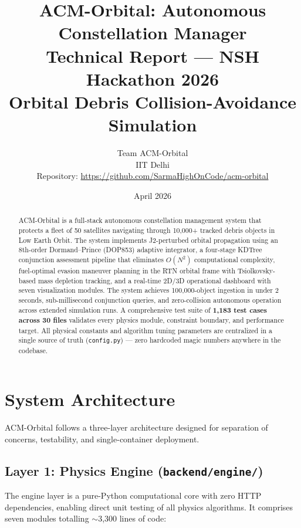\documentclass[11pt,a4paper]{article}
\title{
  \vspace{-1cm}
  \textbf{ACM-Orbital: Autonomous Constellation Manager}\\[6pt]
  \large Technical Report --- NSH Hackathon 2026\\[4pt]
  \normalsize Orbital Debris Collision-Avoidance Simulation
}
\author{
  Team ACM-Orbital\\
  IIT Delhi\\[4pt]
  \small Repository: \url{https://github.com/SarmaHighOnCode/acm-orbital}
}
\date{April 2026}
\begin{document}
\maketitle
\thispagestyle{fancy}

\begin{abstract}
ACM-Orbital is a full-stack autonomous constellation management system that
protects a fleet of 50 satellites navigating through 10,000+ tracked debris
objects in Low Earth Orbit. The system implements J2-perturbed orbital
propagation using an 8th-order Dormand--Prince (DOP853) adaptive integrator,
a four-stage KDTree conjunction assessment pipeline that eliminates $O(N^2)$
computational complexity, fuel-optimal evasion maneuver planning in the RTN
orbital frame with Tsiolkovsky-based mass depletion tracking, and a real-time
2D/3D operational dashboard with seven visualization modules. The system achieves
100,000-object ingestion in under 2 seconds, sub-millisecond conjunction queries,
and zero-collision autonomous operation across extended simulation runs.
A comprehensive test suite of \textbf{1,183 test cases across 30 files} validates
every physics module, constraint boundary, and performance target.
All physical constants and algorithm tuning parameters are centralized in a
single source of truth (\texttt{config.py}) --- zero hardcoded magic numbers
anywhere in the codebase.
\end{abstract}

\tableofcontents
\newpage

\section{System Architecture}

ACM-Orbital follows a three-layer architecture designed for separation of
concerns, testability, and single-container deployment.

\subsection{Layer 1: Physics Engine (\texttt{backend/engine/})}

The engine layer is a pure-Python computational core with zero HTTP
dependencies, enabling direct unit testing of all physics algorithms. It
comprises seven modules totalling $\sim$3,300 lines of code:
\end{document}
